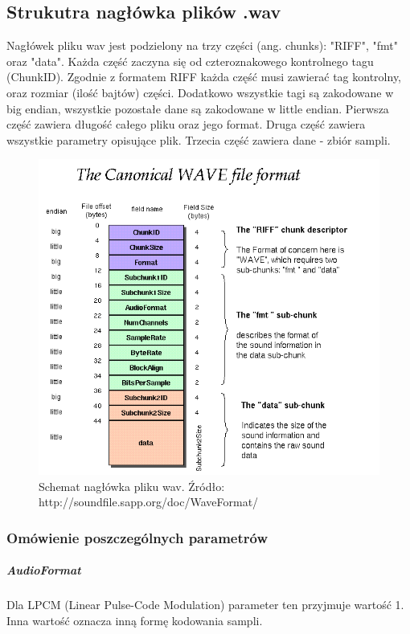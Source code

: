 \documentclass{article}
\begin{document}
\subsection{Strukutra nagłówka plików .wav}

Nagłówek pliku wav jest podzielony na trzy części (ang. chunks): "RIFF", "fmt" oraz "data". Każda część zaczyna się od czteroznakowego kontrolnego tagu (ChunkID). Zgodnie z formatem RIFF każda część musi zawierać tag kontrolny, oraz rozmiar (ilość bajtów) części. Dodatkowo wszystkie tagi są zakodowane w big endian, wszystkie pozostałe dane są zakodowane w little endian. Pierwsza część zawiera długość całego pliku oraz jego format. Druga część zawiera wszystkie parametry opisujące plik. Trzecia część zawiera dane - zbiór sampli.


\begin{figure} 
\centering
\includegraphics[width=15cm]{wav-sound-format.png}
\caption{Schemat nagłówka pliku wav. Źródło: http://soundfile.sapp.org/doc/WaveFormat/}
\end{figure}

\subsubsection{Omówienie poszczególnych parametrów}

\subparagraph{AudioFormat}
Dla LPCM (Linear Pulse-Code Modulation) parameter ten przyjmuje wartość 1. Inna wartość oznacza inną formę kodowania sampli.
\end{document}

